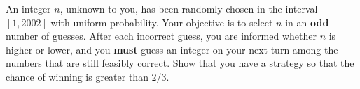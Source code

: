 An integer $n$, unknown to you, has been randomly chosen in the
interval $[1, 2002]$ with uniform probability. Your objective is
to select $n$ in an \textbf{odd} number of guesses. After
each incorrect guess, you are informed whether $n$ is higher
or lower, and you \textbf{must} guess an integer on your next turn
among the numbers that are still feasibly correct. Show that you
have a strategy so that the chance of winning is greater than $2/3$.
